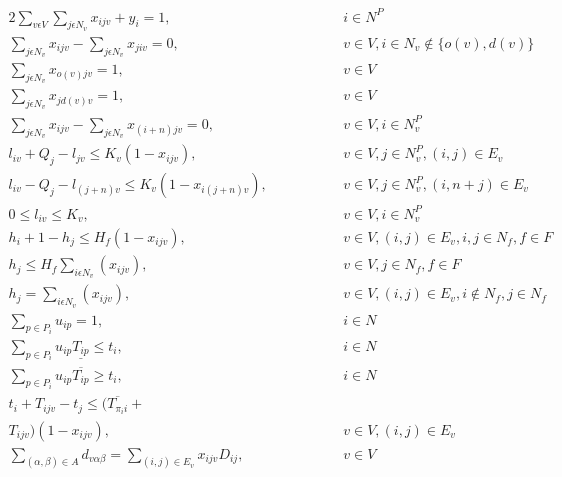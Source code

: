 \documentclass[a4paper,10pt]{article}
\begin{document}
\begingroup
    \allowdisplaybreaks
\begin{alignat} {2}
    	\sum_{v\epsilon V}\sum_{j\epsilon N_v}x_{ijv} + y_i = 1,		&\quad\quad\quad&& 	 i \in N^P 				\label{eq:2} 	\\[4pt]
    	\sum_{j\epsilon N_v}x_{ijv} - \sum_{j\epsilon N_v}x_{jiv} = 0,		& 	&&	v \in V, i\in N_v \notin \{o(v), d(v)\}		\label{eq:3} 	\\[4pt]
    	\sum_{j\epsilon N_v}x_{o(v)jv} = 1,					& 	&&	v \in V 					\label{eq:4}	\\[4pt]
    	\sum_{j\epsilon N_v}x_{j d(v)v} = 1,					& 	&&	v \in V 					\label{eq:5}	\\[4pt]
    	\sum_{j\epsilon N_v}x_{ijv} - \sum_{j\epsilon N_v}x_{(i+n)jv} = 0,	& 	&&	v \in V, i\in N^P_v 				\label{eq:6}	\\[4pt]
    	l_{iv} + Q_j - l_{jv} \leq K_v(1-x_{ijv}),				& 	&&	v \in V, j\in N_v^P, (i,j) \in E_v 		\label{eq:7} 	\\[8pt]
    	l_{iv} - Q_j - l_{(j+n)v} \leq K_v(1-x_{i(j+n)v}),			& 	&&	v \in V ,j\in N_v^P, (i, n+j)\in E_v 		\label{eq:8}	\\[8pt]
    	0 \leq l_{iv} \leq K_v,							& 	&&	v \in V, i \in N^P_v 				\label{eq:9}	\\[8pt]
    	h_{i} + 1 - h_{j} \leq H_f(1-x_{ijv}),					& 	&&	v \in V, (i,j)\in E_v,  i, j \in N_f, f\in F 	\label{eq:10}	\\[4pt]
    	h_{j} \leq H_f\sum_{i\epsilon N_v}(x_{ijv}),				& 	&&	v \in V, j\in N_f, f\in F 			\label{eq:11}	\\[4pt]
    	h_{j} = \sum_{i\epsilon N_v}(x_{ijv}),					& 	&&	v \in V, (i, j)\in E_v, i \notin N_f, j \in N_f	\label{eq:12}	\\[4pt]
    	\sum_{p\in P_i} u_{ip} = 1,						& 	&& 	i \in N 					\label{eq:13}	\\[4pt]
    	\sum_{p\in P_i} u_{ip}\underline{T_{ip}} \leq t_{i},			& 	&&	i \in N 					\label{eq:14}	\\[4pt]
    	\sum_{p\in P_i} u_{ip}\overline{T_{ip}} \geq t_{i},			& 	&& 	i \in N 					\label{eq:15}	\\[4pt]
    	t_{i} + T_{ijv} - t_{j} \leq (\overline{T_{\pi_i i}} + 			& 	&&						\nonumber\\
    	T_{ijv})(1 - x_{ijv}),							& 	&& 	v \in V, (i,j) \in E_v				\label{eq:16}	\\[8pt]
    	\sum_{(\alpha,\beta) \in A}d_{v\alpha\beta} = 
    	\sum_{(i,j) \in E_v} x_{ijv}D_{ij},					& 	&&	v \in V						\label{eq:17}	\\[4pt]

\end{alignat}
\end{document}
